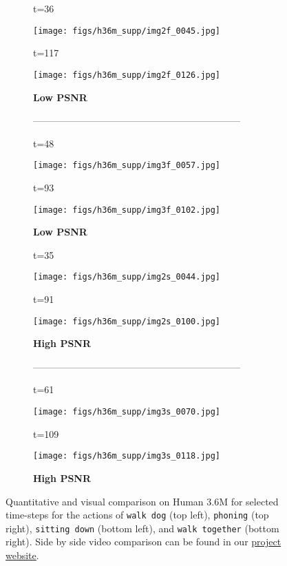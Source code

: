 \documentclass{article}
\begin{document}
\begin{appendix}
\clearpage
\begin{figure}[htb!]
    \centering
    \vspace{30pt}
    \begin{subfigure}{0.40\linewidth}
        \caption*{t=36}
        \vspace{-9pt}
	    \texttt{[image: figs/h36m\_supp/img2f\_0045.jpg]}
  		\caption*{t=117}
        \vspace{-9pt}
  		\texttt{[image: figs/h36m\_supp/img2f\_0126.jpg]}
  		\caption*{\textbf{Low PSNR}}
  		\caption*{-----------------------------------------------------------------}
  		\caption*{t=48}
        \vspace{-9pt}
	    \texttt{[image: figs/h36m\_supp/img3f\_0057.jpg]}
  		\caption*{t=93}
        \vspace{-9pt}
  		\texttt{[image: figs/h36m\_supp/img3f\_0102.jpg]}
  		\caption*{\textbf{Low PSNR}}
	\end{subfigure}
	\hspace{10pt}
    \begin{subfigure}{0.40\linewidth}
        \caption*{t=35}
        \vspace{-9pt}
	    \texttt{[image: figs/h36m\_supp/img2s\_0044.jpg]}
  		\caption*{t=91}
        \vspace{-9pt}
  		\texttt{[image: figs/h36m\_supp/img2s\_0100.jpg]}
  		\caption*{\textbf{High PSNR}}
  		\caption*{-----------------------------------------------------------------}
  		\caption*{t=61}
        \vspace{-9pt}
	    \texttt{[image: figs/h36m\_supp/img3s\_0070.jpg]}
  		\caption*{t=109}
        \vspace{-9pt}
  		\texttt{[image: figs/h36m\_supp/img3s\_0118.jpg]}
  		\caption*{\textbf{High PSNR}}
	\end{subfigure}
	\vspace{-.1cm}
    \caption{Quantitative and visual comparison on  Human 3.6M for selected time-steps for the actions of \texttt{walk dog} (top left), \texttt{phoning} (top right), \texttt{sitting down} (bottom left), and \texttt{walk together} (bottom right). Side by side video comparison can be found in our \href{https://goo.gl/U7UOfy}{project website}.}
\label{fig:h36mbad2}
\vspace{-40pt}
\end{figure}





\end{appendix}
\end{document}
